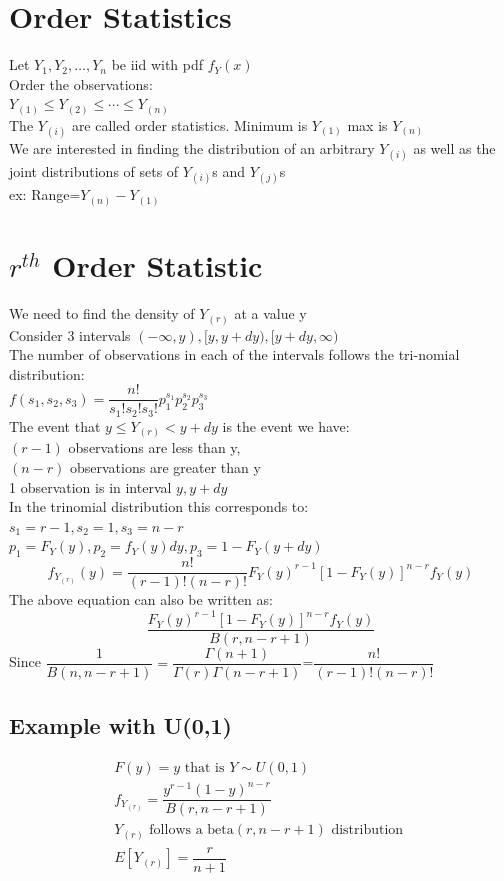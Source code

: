 \documentclass[openany]{book}
\begin{document}
\begin{flushleft}
\section{Order Statistics}
Let $Y_1,Y_2,\dots, Y_n$ be iid with pdf $f_Y(x)$\\
Order the observations:\\
$Y_{(1)}\leq Y_{(2)}\leq \cdots \leq Y_{(n)}$\\
The $Y_{(i)}$ are called order statistics. Minimum is $Y_{(1)}$ max is $Y_{(n)}$\\
We are interested in finding the distribution of an arbitrary $Y_{(i)}$ as well as the joint distributions of sets of $Y_{(i)}$s and $Y_{(j)}$s\\
ex: Range=$Y_{(n)}-Y_{(1)}$
\section{$r^{th}$ Order Statistic}
We need to find the density of $Y_{(r)}$ at a value y\\
Consider 3 intervals $(-\infty,y),[y,y+dy),[y+dy,\infty)$\\
The number of observations in each of the intervals follows the tri-nomial distribution:\\
$f(s_1,s_2,s_3)=\dfrac{n!}{s_1!s_2!s_3!}p_1^{s_1}p_2^{s_2}p_3^{s_3}$\\
The event that $y\leq Y_{(r)}<y+dy$ is the event we have:\\
$(r-1)$ observations are less than y,\\
$(n-r)$ observations are greater than y\\
1 observation is in interval $y,y+dy$\\
In the trinomial distribution this corresponds to:\\
$s_1=r-1,s_2=1,s_3=n-r$\\
$p_1=F_Y(y), p_2=f_Y(y)dy, p_3=1-F_Y(y+dy)$\\
\[f_{Y_{(r)}}(y)=\dfrac{n!}{(r-1)!(n-r)!}F_Y(y)^{r-1}[1-F_Y(y)]^{n-r}f_Y(y)
\]
The above equation can also be written as:\\
\[\dfrac{F_Y(y)^{r-1}[1-F_Y(y)]^{n-r}f_Y(y)}{B(r,n-r+1)}
\]
Since $\dfrac{1}{B(n,n-r+1)}=\dfrac{\Gamma(n+1)}{\Gamma(r)\Gamma(n-r+1)}$=$\dfrac{n!}{(r-1)!(n-r)!}$
\subsection{Example with U(0,1)}
\begin{multline*}
F(y)=y \text{ that is } Y\sim U(0,1)\\
f_{Y_{(r)}}=\dfrac{y^{r-1}(1-y)^{n-r}}{B(r,n-r+1)}\\
Y_{(r)} \text{ follows a beta}(r,n-r+1)\text{ distribution }\\
E[Y_{(r)}]=\dfrac{r}{n+1}\\
\end{multline*}

\end{flushleft}
\end{document}
